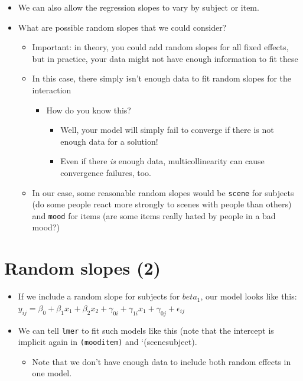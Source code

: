 \documentclass[]{article}
\begin{document}
\begin{itemize}
\itemsep1pt\parskip0pt
\item
  We can also allow the regression slopes to vary by subject or item.
\item
  What are possible random slopes that we could consider?

  \begin{itemize}
  \itemsep1pt\parskip0pt
  \item
    Important: in theory, you could add random slopes for all fixed
    effects, but in practice, your data might not have enough
    information to fit these
  \item
    In this case, there simply isn't enough data to fit random slopes
    for the interaction

    \begin{itemize}
    \itemsep1pt\parskip0pt
    \item
      How do you know this?

      \begin{itemize}
      \itemsep1pt\parskip0pt
      \item
        Well, your model will simply fail to converge if there is not
        enough data for a solution!
      \item
        Even if there \emph{is} enough data, multicollinearity can cause
        convergence failures, too.
      \end{itemize}
    \end{itemize}
  \item
    In our case, some reasonable random slopes would be \texttt{scene}
    for subjects (do some people react more strongly to scenes with
    people than others) and \texttt{mood} for items (are some items
    really hated by people in a bad mood?)
  \end{itemize}
\end{itemize}

\section{Random slopes (2)}\label{random-slopes-2}

\begin{itemize}
\itemsep1pt\parskip0pt
\item
  If we include a random slope for subjects for $beta_1$, our model
  looks like this:
  $y_{ij} = \beta_0 + \beta_1 x_{1} + \beta_2 x_{2} + \gamma_{0i} + \gamma_{1i} x_{1} + \gamma_{0j} + \epsilon_{ij}$
\item
  We can tell \texttt{lmer} to fit such models like this (note that the
  intercept is implicit again in \texttt{(mood\textbar{}item)} and
  `(scene\textbar{}subject).

  \begin{itemize}
  \itemsep1pt\parskip0pt
  \item
    Note that we don't have enough data to include both random effects
    in one model.
  \end{itemize}
\end{itemize}
\end{document}
